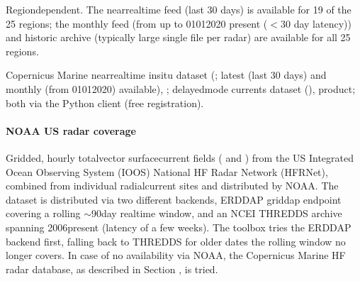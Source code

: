 \documentclass[a4paper,10pt,english]{sphinxmanual}
\begin{document}
\sphinxAtStartPar
{}

\sphinxAtStartPar
Region\sphinxhyphen{}dependent. The near\sphinxhyphen{}real\sphinxhyphen{}time feed (last 30 days) is available for 19 of the 25 regions; the monthly feed (from up to 01\sphinxhyphen{}01\sphinxhyphen{}2020 \sphinxhyphen{} present (\(<30\) day latency)) and historic archive (typically large single file per radar) are available for all 25 regions.

\sphinxAtStartPar
{}

\sphinxAtStartPar
Copernicus Marine near\sphinxhyphen{}real\sphinxhyphen{}time in\sphinxhyphen{}situ dataset (; latest (last 30 days) and monthly (from 01\sphinxhyphen{}01\sphinxhyphen{}2020) available),  ; delayed\sphinxhyphen{}mode currents dataset (),  product; both via the  Python client (free registration).


\paragraph{NOAA \sphinxhyphen{} US radar coverage}
\label{\detokenize{05_reference_datasets:noaa-us-radar-coverage}}\label{\detokenize{05_reference_datasets:subpar-hfr-noaa}}
\sphinxAtStartPar
{}

\sphinxAtStartPar
Gridded, hourly total\sphinxhyphen{}vector surface\sphinxhyphen{}current fields ( and ) from the US Integrated Ocean Observing System (IOOS) National HF Radar Network (HFRNet), combined from individual radial\sphinxhyphen{}current sites and distributed by NOAA. The dataset is distributed via two different backends, ERDDAP griddap endpoint covering a rolling \(\sim\)90\sphinxhyphen{}day real\sphinxhyphen{}time window, and an NCEI THREDDS archive spanning 2006\sphinxhyphen{}present (latency of a few weeks). The  toolbox tries the ERDDAP backend first, falling back to THREDDS for older dates the rolling window no longer covers. In case of no availability via NOAA, the Copernicus Marine HF radar database, as described in Section {\hyperref[\detokenize{05_reference_datasets:subpar-hfr-cmems}]{}}, is tried.
\end{document}
